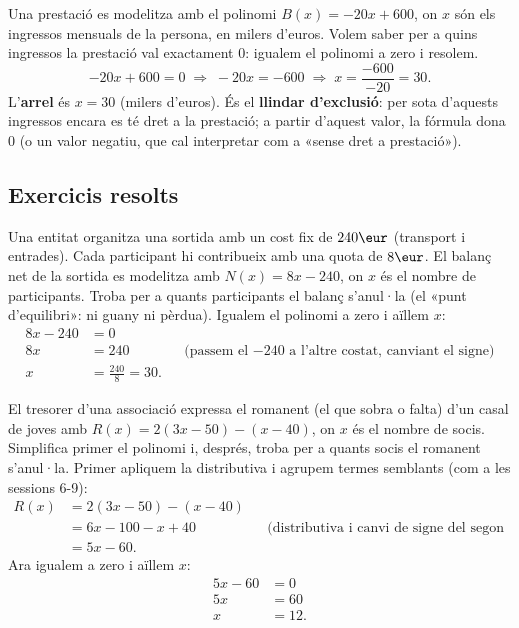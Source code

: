 \begin{exemple}
Una prestació es modelitza amb el polinomi $B(x)=-20x+600$, on $x$ són els
ingressos mensuals de la persona, en milers d'euros. Volem saber per a quins
ingressos la prestació val exactament $0$: igualem el polinomi a zero i resolem.
\[
-20x+600=0 \;\Longrightarrow\; -20x=-600 \;\Longrightarrow\; x=\frac{-600}{-20}=30.
\]
L'\textbf{arrel} és $x=30$ (milers d'euros). És el \textbf{llindar d'exclusió}:
per sota d'aquests ingressos encara es té dret a la prestació; a partir
d'aquest valor, la fórmula dona $0$ (o un valor negatiu, que cal interpretar
com a «sense dret a prestació»).
\end{exemple}

\subsection{Exercicis resolts}

\begin{exresolt}
Una entitat organitza una sortida amb un cost fix de $240\eur$ (transport i
entrades). Cada participant hi contribueix amb una quota de $8\eur$. El balanç
net de la sortida es modelitza amb $N(x)=8x-240$, on $x$ és el nombre de
participants. Troba per a quants participants el balanç s'anul·la (el «punt
d'equilibri»: ni guany ni pèrdua).
\solucio
Igualem el polinomi a zero i aïllem $x$:
\begin{align*}
8x-240&=0\\
8x&=240 &&\text{(passem el $-240$ a l'altre costat, canviant el signe)}\\
x&=\frac{240}{8}=30.
\end{align*}
\end{exresolt}

\begin{exresolt}
El tresorer d'una associació expressa el romanent (el que sobra o falta) d'un
casal de joves amb $R(x)=2(3x-50)-(x-40)$, on $x$ és el nombre de socis.
Simplifica primer el polinomi i, després, troba per a quants socis el romanent
s'anul·la.
\solucio
Primer apliquem la distributiva i agrupem termes semblants (com a les
sessions 6-9):
\begin{align*}
R(x)&=2(3x-50)-(x-40)\\
&=6x-100-x+40 &&\text{(distributiva i canvi de signe del segon parèntesi)}\\
&=5x-60.
\end{align*}
Ara igualem a zero i aïllem $x$:
\begin{align*}
5x-60&=0\\
5x&=60\\
x&=12.
\end{align*}
\end{exresolt}

